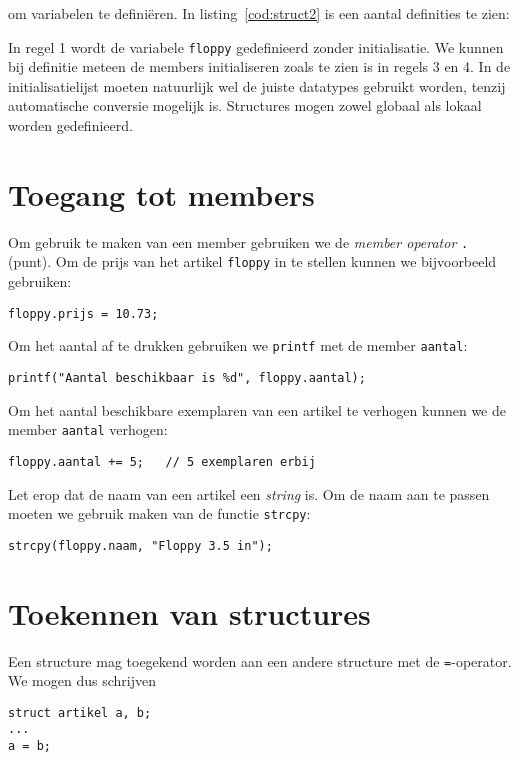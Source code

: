 om variabelen te definiëren. In listing~\ref{cod:struct2} is een aantal definities te zien:


In regel 1 wordt de variabele \texttt{floppy} gedefinieerd zonder initialisatie. We kunnen bij definitie meteen de members initialiseren zoals te zien is in regels 3 en 4. In de initialisatielijst moeten natuurlijk wel de juiste datatypes gebruikt worden, tenzij automatische conversie mogelijk is. Structures mogen zowel globaal als lokaal worden gedefinieerd.

\section{Toegang tot members}
Om gebruik te maken van een member gebruiken we de \textsl{member operator} \texttt{.} (punt). Om de prijs van het artikel \texttt{floppy} in te stellen kunnen we bijvoorbeeld gebruiken:

\hspace*{1em}\texttt{floppy.prijs = 10.73;}

Om het aantal af te drukken gebruiken we \texttt{printf} met de member \texttt{aantal}:

\hspace*{1em}\texttt{printf("Aantal beschikbaar is \%d", floppy.aantal);}

Om het aantal beschikbare exemplaren van een artikel te verhogen kunnen we de member \texttt{aantal} verhogen:

\hspace*{1em}\texttt{floppy.aantal += 5; \ \ // 5 exemplaren erbij}

Let erop dat de naam van een artikel een \textsl{string} is. Om de naam aan te passen moeten we gebruik maken van de functie \texttt{strcpy}:

\hspace*{1em}\texttt{strcpy(floppy.naam, "Floppy 3.5 in");}


\section{Toekennen van structures}
Een structure mag toegekend worden aan een andere structure met de \texttt{=}-operator. We mogen dus schrijven

\begin{lstlisting}[style=lstoneline]
struct artikel a, b;
...
a = b;
\end{lstlisting}

